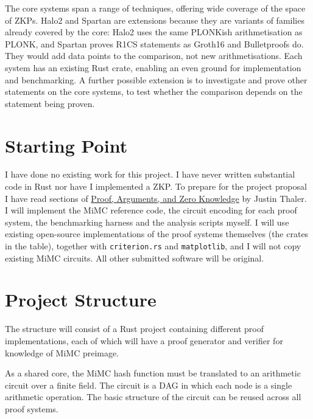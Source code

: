 \documentclass[11pt,a4paper]{article}
\begin{document}
The core systems span a range of techniques, offering wide coverage of the space of ZKPs. Halo2 and Spartan are extensions because they are variants of families already covered by the core: Halo2 uses the same PLONKish arithmetisation as PLONK, and Spartan proves R1CS statements as Groth16 and Bulletproofs do. They would add data points to the comparison, not new arithmetisations. Each system has an existing Rust crate, enabling an even ground for implementation and benchmarking. A further possible extension is to investigate and prove other statements on the core systems, to test whether the comparison depends on the statement being proven. 

\section{Starting Point}

I have done no existing work for this project. I have never written substantial code in Rust nor have I implemented a ZKP. To prepare for the project proposal I have read sections of \href{https://people.cs.georgetown.edu/jthaler/ProofsArgsAndZK.pdf}{Proof, Arguments, and Zero Knowledge} by Justin Thaler. I will implement the MiMC reference code, the circuit encoding for each proof system, the benchmarking harness and the analysis scripts myself. I will use existing open-source implementations of the proof systems themselves (the crates in the table), together with \texttt{criterion.rs} and \texttt{matplotlib}, and I will not copy existing MiMC circuits. All other submitted software will be original.

\section{Project Structure}

The structure will consist of a Rust project containing different proof implementations, each of which will have a proof generator and verifier for knowledge of MiMC preimage. 

As a shared core, the MiMC hash function must be translated to an arithmetic circuit over a finite field. The circuit is a DAG in which each node is a single arithmetic operation. The basic structure of the circuit can be reused across all proof systems.
\end{document}
